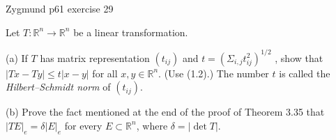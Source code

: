 \documentclass[UTF8,a4paper,10pt]{article}
\begin{document}
  \pagebreak

  \begin{Problem}[]{Zygmund p61 exercise 29}

Let \(T : \mathbb{R}^n → \mathbb{R}^n\) be a linear transformation.

(a) If \(T\) has matrix representation \((t_{ij})\) and \(t = (\Sigma_{i,j}t_{ij}^2)^{1/2}\) , show that \(|Tx - Ty| \leq t|x - y|\) for all \(x, y \in \mathbb{R}^n\). (Use (1.2).) The number \(t\) is called the \textit{Hilbert–Schmidt norm} of \((t_{ij})\).

(b) Prove the fact mentioned at the end of the proof of Theorem 3.35 that \(|TE|_e = \delta|E|_e\) for every \(E \subset \mathbb{R}^n\), where \(\delta  = |\det T|\).

  \end{Problem}
\end{document}
